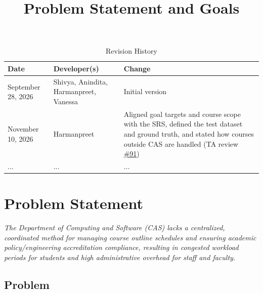 \documentclass{article}
\title{Problem Statement and Goals\\\progname}
\author{\authname}
\date{}
\begin{document}
\maketitle

\begin{table}[hp]
\caption{Revision History} \label{TblRevisionHistory}
\begin{tabularx}{\textwidth}{llX}
\toprule
\textbf{Date} & \textbf{Developer(s)} & \textbf{Change}\\
\midrule
September 28, 2026 & Shivya, Anindita, Harmanpreet, Vanessa& Initial version\\
November 10, 2026 & Harmanpreet & Aligned goal targets and course scope with the SRS, defined the test dataset and ground truth, and stated how courses outside CAS are handled (TA review \href{https://github.com/shivyam/cas-course-optimization/issues/91}{\#91})\\
... & ... & ...\\
\bottomrule
\end{tabularx}
\end{table}

\section{Problem Statement}

\textit{The Department of Computing and Software (CAS) lacks a centralized, coordinated
method for managing course outline schedules and ensuring academic policy/engineering accreditation compliance, 
resulting in congested workload periods for students and high administrative overhead for staff and faculty.}

\subsection{Problem}
\end{document}
